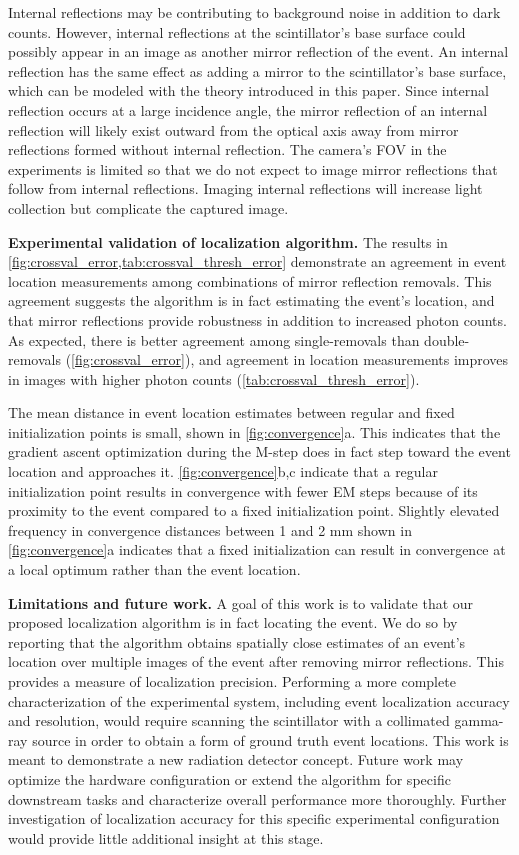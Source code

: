 Internal reflections may be contributing to background noise in addition to dark counts.
However, internal reflections at the scintillator's base surface could possibly 
appear in an image as another mirror reflection of the event.
An internal reflection has the same effect as adding a mirror to the 
scintillator's base surface, which can be modeled with the theory introduced in 
this paper.
Since internal reflection occurs at a large incidence angle, the 
mirror reflection of an internal reflection will likely exist 
outward from the optical axis away from mirror reflections formed 
without internal reflection. 
The camera's FOV in the experiments is limited so that we do not 
expect to image mirror reflections that follow from internal reflections.
Imaging internal reflections will increase light collection but complicate the 
captured image.

\noindent
\textbf{Experimental validation of localization algorithm.}
The results in \cref{fig:crossval_error,tab:crossval_thresh_error} demonstrate an 
agreement in event location measurements among combinations of mirror reflection 
removals.
This agreement suggests the algorithm is in fact estimating the event's location, 
and that mirror reflections provide robustness in addition to increased photon counts.
As expected, there is better agreement among single-removals than double-removals 
(\cref{fig:crossval_error}), and agreement in location measurements improves in 
images with higher photon counts (\cref{tab:crossval_thresh_error}).

The mean distance in event location estimates between regular and fixed 
initialization points is small, shown in \cref{fig:convergence}a.
This indicates that the gradient ascent optimization during the M-step does in 
fact step toward the event location and approaches it.
\cref{fig:convergence}b,c indicate that a regular initialization point results in 
convergence with fewer EM steps because of its proximity to the event compared to 
a fixed initialization point. 
Slightly elevated frequency in convergence distances between 1 and 2 mm shown in 
\cref{fig:convergence}a indicates that a fixed initialization can result in 
convergence at a local optimum rather than the event location.

\noindent
\textbf{Limitations and future work.}
A goal of this work is to validate that our proposed localization algorithm is in 
fact locating the event.
We do so by reporting that the algorithm obtains spatially close estimates of an 
event's location over multiple images of the event after removing mirror reflections.
This provides a measure of localization precision.
Performing a more complete characterization of the experimental system, 
including event localization accuracy and resolution, 
would require scanning the scintillator with a collimated gamma-ray source in
order to obtain a form of ground truth event locations.
This work is meant to demonstrate a new radiation detector concept.
Future work may optimize the hardware configuration or extend the algorithm for 
specific downstream tasks and characterize overall performance more thoroughly.
Further investigation of localization accuracy for this specific experimental 
configuration would provide little additional insight at this stage.

